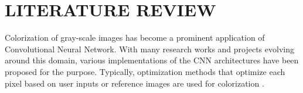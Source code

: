 \chapter{LITERATURE REVIEW}
Colorization of gray-scale images has become a prominent application of Convolutional Neural Network. With many research works and projects evolving around this domain, various implementations of the CNN architectures have been proposed for the purpose. Typically, optimization methods that optimize each pixel based on user inputs or reference images are used for colorization \cite{Nepalipaper}.